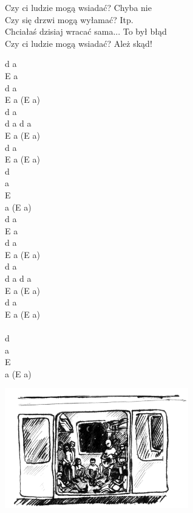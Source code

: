 \documentclass[a5paper, 10pt]{book}
\begin{document}
\begin{minipage}[t]{0.8\textwidth}
\hspace*{7mm}Czy ci ludzie mogą wsiadać? Chyba nie\\
\hspace*{7mm}Czy się drzwi mogą wyłamać? Itp.\\
\hspace*{7mm}Chciałaś dzisiaj wracać sama... To był błąd\\
\hspace*{7mm}Czy ci ludzie mogą wsiadać? Ależ skąd!\\
\end{minipage}
\begin{minipage}[t]{0.2\textwidth}
d a\\
E a\\
d a\\
E a (E a)\vspace*{1.5mm}\\
d a\\
d a d a\\
E a (E a)\\
d a\\
E a (E a)\\

d\\
a\\
E\\
a (E a)\\

 d a\\
 E a\\
 d a\\
 E a (E a)\vspace*{1.5mm}\\
 d a\\
 d a d a\\
 E a (E a)\\
 d a\\
 E a (E a)\\
 \\
 d\\
 a\\
 E\\
 a (E a)\\
\end{minipage}
\includegraphics[height=5.2cm, center]{images/czy_ci_ludzie.png}
\end{document}
